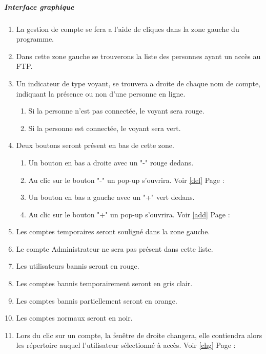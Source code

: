 \documentclass[10pt,a4paper]{report}
\begin{document}
\subparagraph{Interface graphique}
	\begin{enumerate}
		\item La gestion de compte se fera a l'aide de cliques dans la zone gauche du programme.\label{cpt} 
		\item Dans cette zone gauche se trouverons la liste des personnes ayant un accès au FTP.
		\item Un indicateur de type voyant, se trouvera a droite de chaque nom de compte, indiquant la présence ou non d'une personne en ligne.
			\begin{enumerate}[label=\arabic*.]
				\item Si la personne n'est pas connectée, le voyant sera rouge.
				\item Si la personne est connectée, le voyant sera vert.
			\end{enumerate} 
		\item Deux boutons seront présent en bas de cette zone.
			\begin{enumerate}[label=\arabic*.]
				\item Un bouton en bas a droite avec un "-" rouge dedans.\label{bgr} 
				\item Au clic sur le bouton "-" un pop-up s'ouvrira. Voir \ref{del} Page : \pageref{del}
				\item Un bouton en bas a gauche avec un "+" vert dedans.\label{bdv}
				\item Au clic sur le bouton "+" un pop-up s'ouvrira. Voir \ref{add} Page : \pageref{add}
			\end{enumerate} 
		\item Les comptes temporaires seront souligné dans la zone gauche.
		\item Le compte Administrateur ne sera pas présent dans cette liste.
		\item Les utilisateurs bannis seront en rouge.
		\item Les comptes bannis temporairement seront en gris clair.
		\item Les comptes bannis partiellement seront en orange.
		\item Les comptes normaux seront en noir.
		\item Lors du clic sur un compte, la fenêtre de droite changera, elle contiendra alors les répertoire auquel l'utilisateur sélectionné à accès. Voir \ref{chg} Page : \pageref{chg}
	\end{enumerate}
	
\end{document}
